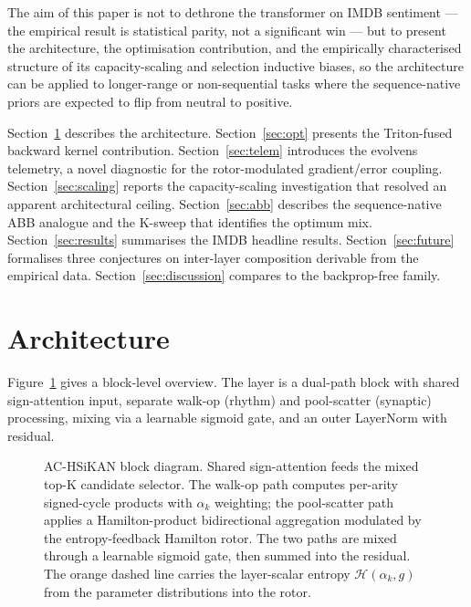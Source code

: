 \documentclass[11pt, a4paper]{article}
\begin{document}
The aim of this paper is not to dethrone the transformer on IMDB
sentiment --- the empirical result is statistical parity, not a
significant win --- but to present the architecture, the optimisation
contribution, and the empirically characterised structure of its
capacity-scaling and selection inductive biases, so the architecture
can be applied to longer-range or non-sequential tasks where the
sequence-native priors are expected to flip from neutral to
positive.

Section~\ref{sec:arch} describes the architecture.
Section~\ref{sec:opt} presents the Triton-fused backward kernel
contribution. Section~\ref{sec:telem} introduces the evolvens telemetry,
a novel diagnostic for the rotor-modulated gradient/error coupling.
Section~\ref{sec:scaling} reports the capacity-scaling investigation
that resolved an apparent architectural ceiling.
Section~\ref{sec:abb} describes the sequence-native ABB analogue and
the K-sweep that identifies the optimum mix.
Section~\ref{sec:results} summarises the IMDB headline results.
Section~\ref{sec:future} formalises three conjectures on inter-layer
composition derivable from the empirical data.
Section~\ref{sec:discussion} compares to the backprop-free family.

\section{Architecture}
\label{sec:arch}

Figure~\ref{fig:arch} gives a block-level overview. The layer is a
dual-path block with shared sign-attention input, separate walk-op
(rhythm) and pool-scatter (synaptic) processing, mixing via a learnable
sigmoid gate, and an outer LayerNorm with residual.

\begin{figure}[t]
  \centering
  
  \caption{AC-HSiKAN block diagram. Shared sign-attention feeds the
  mixed top-K candidate selector. The walk-op path computes per-arity
  signed-cycle products with $\alpha_k$ weighting; the pool-scatter
  path applies a Hamilton-product bidirectional aggregation modulated
  by the entropy-feedback Hamilton rotor. The two paths are mixed
  through a learnable sigmoid gate, then summed into the residual.
  The orange dashed line carries the layer-scalar entropy
  $\mathcal{H}(\alpha_k, g)$ from the parameter distributions into
  the rotor.}
  \label{fig:arch}
\end{figure}
\end{document}

